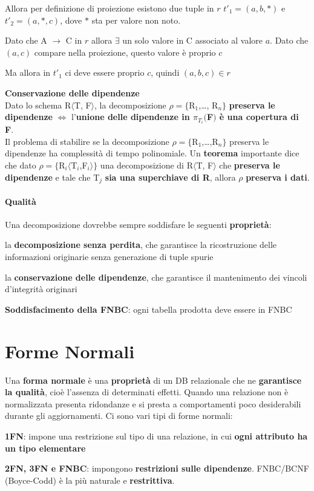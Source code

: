 \documentclass[10pt]{book}
\begin{document}
\begin{list}{}{}
\begin{list}{}{}
\begin{list}{}{}
			\item Allora per definizione di proiezione esistono due tuple in $r$ $t'_1=(a, b, *)$ e $t'_2=(a, *, c)$, dove $*$ sta per valore non noto.
			\item Dato che A $\rightarrow$ C in $r$ allora $\exists$ un solo valore in C associato al valore $a$. Dato che $(a, c)$ compare nella proiezione, questo valore è proprio $c$
			\item Ma allora in $t'_1$ ci deve essere proprio $c$, quindi $(a, b, c) \in r$
		\end{list}
	\end{list}
	\item \textbf{Conservazione delle dipendenze}\\
	Dato lo schema R$\langle$T, F$\rangle$, la decomposizione $\rho = \{$R$_1$,\ldots, R$_n\}$ \textbf{preserva le dipendenze} $\Leftrightarrow$ l'\textbf{unione delle dipendenze in $\pi_{T_i}($F$)$ è una copertura di F}.\\
	Il problema di stabilire se la decomposizione $\rho = \{$R$_1$,\ldots,R$_n\}$ preserva le dipendenze ha complessità di tempo polinomiale. Un \textbf{teorema} importante dice che dato $\rho = \{$R$_i\langle$T$_i$,F$_i\rangle\}$ una decomposizione di R$\langle$T, F$\rangle$ che \textbf{preserva le dipendenze} e tale che T$_j$ \textbf{sia una superchiave di R}, allora $\rho$ \textbf{preserva i dati}.
\end{list}
\paragraph{Qualità} Una decomposizione dovrebbe sempre soddisfare le seguenti \textbf{proprietà}:
\begin{list}{}{}
	\item la \textbf{decomposizione senza perdita}, che garantisce la ricostruzione delle informazioni originarie senza generazione di tuple spurie
	\item la \textbf{conservazione delle dipendenze}, che garantisce il mantenimento dei vincoli d'integrità originari
	\item \textbf{Soddisfacimento della FNBC}: ogni tabella prodotta deve essere in FNBC
\end{list}
\section{Forme Normali}
Una \textbf{forma normale} è una \textbf{proprietà} di un DB relazionale che ne \textbf{garantisce la qualità}, cioè l'assenza di determinati effetti. Quando una relazione non è normalizzata presenta ridondanze e si presta a comportamenti poco desiderabili durante gli aggiornamenti. Ci sono vari tipi di forme normali:
\begin{list}{}{}
	\item \textbf{1FN}: impone una restrizione sul tipo di una relazione, in cui \textbf{ogni attributo ha un tipo elementare}
	\item \textbf{2FN, 3FN e FNBC}: impongono \textbf{restrizioni sulle dipendenze}. FNBC/BCNF (Boyce-Codd) è la più naturale e \textbf{restrittiva}.
\end{list}
\end{document}
